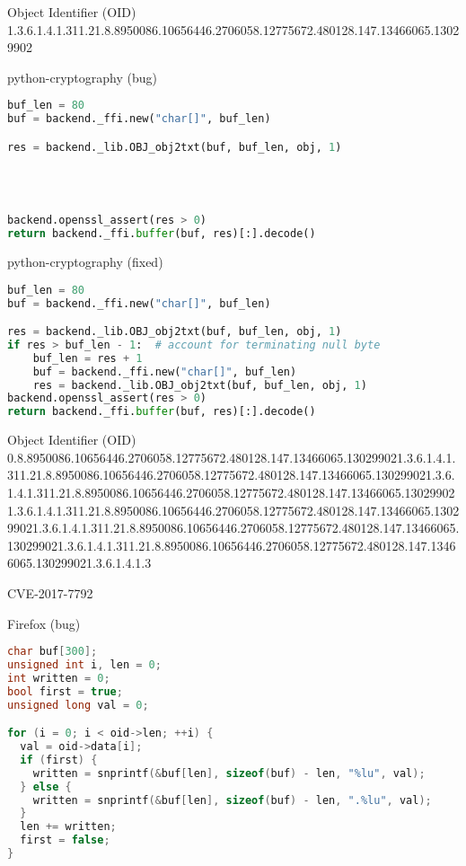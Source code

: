\documentclass[ignorenonframetext,aspectratio=169]{beamer}
\begin{document}
\begin{frame}{Object Identifier (OID)}
  \Large
  1.3.6.1.4.1.311.21.8.8950086.10656446.2706058.12775672.480128.147.13466065.13029902
\end{frame}

\begin{frame}[fragile]{python-cryptography (bug)}
\begin{lstlisting}[language=Python]
buf_len = 80
buf = backend._ffi.new("char[]", buf_len)

res = backend._lib.OBJ_obj2txt(buf, buf_len, obj, 1)




backend.openssl_assert(res > 0)
return backend._ffi.buffer(buf, res)[:].decode()
\end{lstlisting}
\end{frame}

\begin{frame}[fragile]{python-cryptography (fixed)}
\begin{lstlisting}[language=Python]
buf_len = 80
buf = backend._ffi.new("char[]", buf_len)

res = backend._lib.OBJ_obj2txt(buf, buf_len, obj, 1)
if res > buf_len - 1:  # account for terminating null byte
    buf_len = res + 1
    buf = backend._ffi.new("char[]", buf_len)
    res = backend._lib.OBJ_obj2txt(buf, buf_len, obj, 1)
backend.openssl_assert(res > 0)
return backend._ffi.buffer(buf, res)[:].decode()
\end{lstlisting}
\end{frame}

\begin{frame}{Object Identifier (OID)}
  \Large
  0.8.8950086.10656446.2706058.12775672.480128.147.13466065.130299021.3.6.1.4.1.311.21.8.8950086.10656446.2706058.12775672.480128.147.13466065.130299021.3.6.1.4.1.311.21.8.8950086.10656446.2706058.12775672.480128.147.13466065.130299021.3.6.1.4.1.311.21.8.8950086.10656446.2706058.12775672.480128.147.13466065.130299021.3.6.1.4.1.311.21.8.8950086.10656446.2706058.12775672.480128.147.13466065.130299021.3.6.1.4.1.311.21.8.8950086.10656446.2706058.12775672.480128.147.13466065.130299021.3.6.1.4.1.3
\end{frame}

\begin{frame}[plain]
\huge
CVE-2017-7792
\end{frame}

\begin{frame}[fragile]{Firefox (bug)}
\begin{lstlisting}[language=C++]
char buf[300];
unsigned int i, len = 0;
int written = 0;
bool first = true;
unsigned long val = 0;

for (i = 0; i < oid->len; ++i) {
  val = oid->data[i];
  if (first) {
    written = snprintf(&buf[len], sizeof(buf) - len, "%lu", val);
  } else {
    written = snprintf(&buf[len], sizeof(buf) - len, ".%lu", val);
  }
  len += written;
  first = false;
}
\end{lstlisting}
\end{frame}
\end{document}
